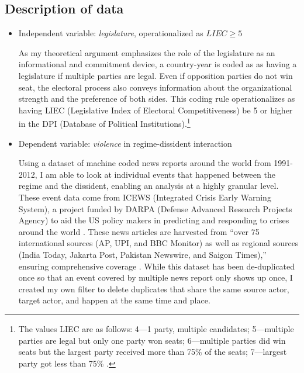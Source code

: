 \subsection{Description of data}

\begin{itemize}

\item Independent variable: \textit{legislature}, operationalized as $LIEC \geq 5$ 

As my theoretical argument emphasizes the role of the legislature as an informational and commitment device, a country-year is coded as as having a legislature if multiple parties are legal. Even if opposition parties do not win seat, the electoral process also conveys information about the organizational strength and the preference of both sides. This coding rule operationalizes as having LIEC (Legislative Index of Electoral Competitiveness) be 5 or higher in the DPI (Database of Political Institutions).\footnote{The values LIEC are as follows: 4---1 party, multiple candidates; 5---multiple parties are legal but only one party won seats; 6---multiple parties did win seats but the largest party received more than 75\% of the seats; 7---largest party got less than 75\% \citep[14]{Keefer2002}.}

\item Dependent variable: \textit{violence} in regime-dissident interaction

Using a dataset of machine coded news reports around the world from 1991-2012, I am able to look at individual events that happened between the regime and the dissident, enabling an analysis at a highly granular level. These event data come from ICEWS (Integrated Crisis Early Warning System), a project funded by DARPA (Defense Advanced Research Projects Agency) to aid the US policy makers in predicting and responding to crises around the world . These news articles are harvested from ``over 75 international sources (AP, UPI, and BBC Monitor) as well as regional sources (India Today, Jakarta Post, Pakistan Newswire, and Saigon Times),'' ensuring comprehensive coverage \citep[94]{OBrien2010, OBrien2013}. While this dataset has been de-duplicated once so that an event covered by multiple news report only shows up once, I created my own filter to delete duplicates that share the same source actor, target actor, and happen at the same time and place.


\end{itemize}
